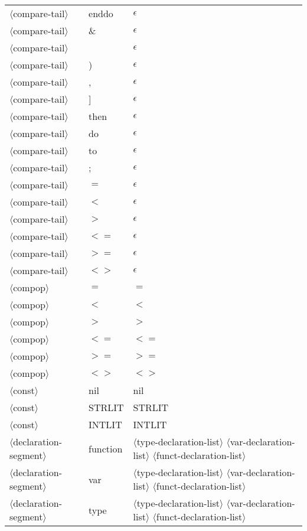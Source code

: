 \documentclass[11pt, fleqn]{article}
\newcommand{\atag}[1]{$\langle$#1$\rangle$}
\begin{document}
\begin{longtable}{l|l|l}
\atag{compare-tail}				&	enddo		&	$\epsilon$					\\
\atag{compare-tail}				&	\&			&	$\epsilon$					\\
\atag{compare-tail}				&	\textbar			&	$\epsilon$					\\
\atag{compare-tail}				&	)			&	$\epsilon$					\\
\atag{compare-tail}				&	,			&	$\epsilon$					\\
\atag{compare-tail}				&	]			&	$\epsilon$					\\
\atag{compare-tail}				&	then			&	$\epsilon$					\\
\atag{compare-tail}				&	do			&	$\epsilon$					\\
\atag{compare-tail}				&	to			&	$\epsilon$					\\
\atag{compare-tail}				&	;			&	$\epsilon$					\\
\atag{compare-tail}				&	$=$			&	$\epsilon$					\\
\atag{compare-tail}				&	$<$			&	$\epsilon$					\\
\atag{compare-tail}				&	$>$			&	$\epsilon$					\\
\atag{compare-tail}				&	$<=$			&	$\epsilon$					\\
\atag{compare-tail}				&	$>=$			&	$\epsilon$					\\
\atag{compare-tail}				&	$<>$			&	$\epsilon$						\\
\atag{compop}					&	$=$			&	$=$								\\
\atag{compop}					&	$<$			&	$<$								\\
\atag{compop}					&	$>$			&	$>$								\\
\atag{compop}					&	$<=$			&	$<=$								\\
\atag{compop}					&	$>=$			&	$>=$								\\
\atag{compop}					&	$<>$			&	$<>$								\\
\atag{const}						&	nil			&	nil	\\
\atag{const}						&	STRLIT		&	STRLIT	\\
\atag{const}						&	INTLIT		&	INTLIT	\\
\atag{declaration-segment}		&	function		&	\atag{type-declaration-list}	\atag{var-declaration-list} \atag{funct-declaration-list}	\\
\atag{declaration-segment}		&	var			&	\atag{type-declaration-list}	\atag{var-declaration-list} \atag{funct-declaration-list}	\\
\atag{declaration-segment}		&	type			&	\atag{type-declaration-list}	\atag{var-declaration-list} \atag{funct-declaration-list}	\\

\end{longtable}
\end{document}

